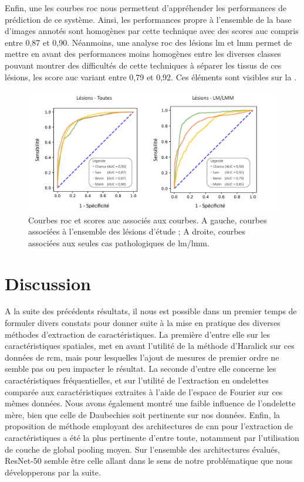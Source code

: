 Enfin, une les courbes \gls{roc} nous permettent d'appréhender les performances de prédiction de ce système. Ainsi, les performances propre à l'ensemble de la base d'images annotés sont homogènes par cette technique avec des scores \gls{auc} compris entre 0,87 et 0,90. Néanmoins, une analyse \gls{roc} des lésions \gls{lm} et \gls{lmm} permet de mettre en avant des performances moins homogènes entre les diverses classes pouvant montrer des difficultés de cette techniques à séparer les tissus de ces lésions, les score \gls{auc} variant entre 0,79 et 0,92. Ces éléments sont visibles sur la .\par

\begin{figure}[H]
    \centering
    \includegraphics[width=\textwidth]{contents/chapter_4/resources/results_image_classification_roc.pdf}
    \caption{Courbes \gls{roc} et scores \gls{auc} associés aux courbes. A gauche, courbes associées à l'ensemble des lésions d'étude ; A droite, courbes associées aux seules cas pathologiques de \gls{lm}/\gls{lmm}.}
    \label{fig:results_image_classification_roc}
\end{figure}\par

\section{Discussion}
A la suite des précédents résultats, il nous est possible dans un premier temps de formuler divers constats pour donner suite à la mise en pratique des diverses méthodes d'extraction de caractéristiques. La première d'entre elle sur les caractéristiques spatiales, met en avant l'utilité de la méthode d'Haralick sur ces données de \gls{rcm}, mais pour lesquelles l'ajout de mesures de premier ordre ne semble pas ou peu impacter le résultat. La seconde d'entre elle concerne les caractéristiques fréquentielles, et sur l'utilité de l'extraction en ondelettes comparée aux caractéristiques extraites à l'aide de l'espace de Fourier sur ces mêmes données. Nous avons également montré une faible influence de l'ondelette mère, bien que celle de Daubechies soit pertinente sur nos données. Enfin, la proposition de méthode employant des architectures de \gls{cnn} pour l'extraction de caractéristiques a été la plus pertinente d'entre toute, notamment par l'utilisation de couche de global pooling moyen. Sur l'ensemble des architectures évalués, ResNet-50 semble être celle allant dans le sens de notre problématique que nous développerons par la suite.\par

